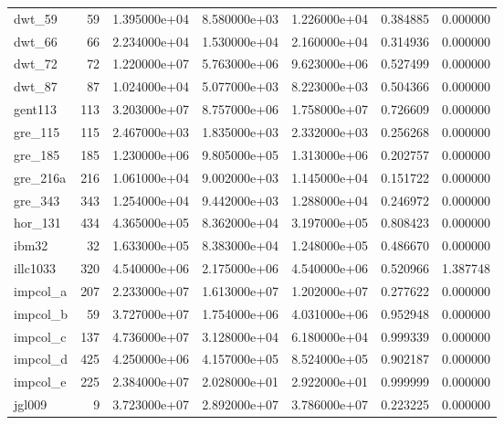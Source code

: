 \begin{tabular}{lrrrrrr}
dwt\_59                  &   59 &  1.395000e+04 &  8.580000e+03 &  1.226000e+04 &  0.384885 &  0.000000 \\
dwt\_66                  &   66 &  2.234000e+04 &  1.530000e+04 &  2.160000e+04 &  0.314936 &  0.000000 \\
dwt\_72                  &   72 &  1.220000e+07 &  5.763000e+06 &  9.623000e+06 &  0.527499 &  0.000000 \\
dwt\_87                  &   87 &  1.024000e+04 &  5.077000e+03 &  8.223000e+03 &  0.504366 &  0.000000 \\
gent113                 &  113 &  3.203000e+07 &  8.757000e+06 &  1.758000e+07 &  0.726609 &  0.000000 \\
gre\_115                 &  115 &  2.467000e+03 &  1.835000e+03 &  2.332000e+03 &  0.256268 &  0.000000 \\
gre\_185                 &  185 &  1.230000e+06 &  9.805000e+05 &  1.313000e+06 &  0.202757 &  0.000000 \\
gre\_216a                &  216 &  1.061000e+04 &  9.002000e+03 &  1.145000e+04 &  0.151722 &  0.000000 \\
gre\_343                 &  343 &  1.254000e+04 &  9.442000e+03 &  1.288000e+04 &  0.246972 &  0.000000 \\
hor\_131                 &  434 &  4.365000e+05 &  8.362000e+04 &  3.197000e+05 &  0.808423 &  0.000000 \\
ibm32                   &   32 &  1.633000e+05 &  8.383000e+04 &  1.248000e+05 &  0.486670 &  0.000000 \\
illc1033                &  320 &  4.540000e+06 &  2.175000e+06 &  4.540000e+06 &  0.520966 &  1.387748 \\
impcol\_a                &  207 &  2.233000e+07 &  1.613000e+07 &  1.202000e+07 &  0.277622 &  0.000000 \\
impcol\_b                &   59 &  3.727000e+07 &  1.754000e+06 &  4.031000e+06 &  0.952948 &  0.000000 \\
impcol\_c                &  137 &  4.736000e+07 &  3.128000e+04 &  6.180000e+04 &  0.999339 &  0.000000 \\
impcol\_d                &  425 &  4.250000e+06 &  4.157000e+05 &  8.524000e+05 &  0.902187 &  0.000000 \\
impcol\_e                &  225 &  2.384000e+07 &  2.028000e+01 &  2.922000e+01 &  0.999999 &  0.000000 \\
jgl009                  &    9 &  3.723000e+07 &  2.892000e+07 &  3.786000e+07 &  0.223225 &  0.000000 \\

\end{tabular}
